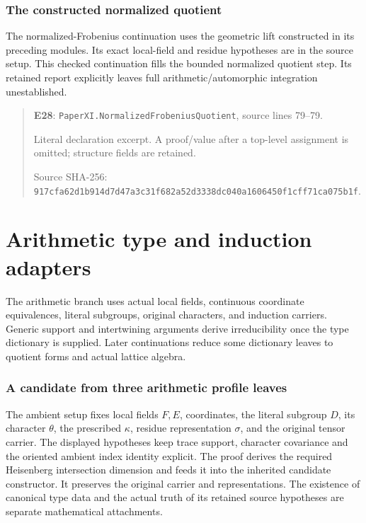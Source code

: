 \documentclass[10pt,oneside]{book}
\begin{document}
\subsection{The constructed normalized quotient}
\label{guide:E28}
The normalized-Frobenius continuation uses the geometric lift constructed in its preceding modules. Its exact local-field and residue hypotheses are in the source setup.
This checked continuation fills the bounded normalized quotient step. Its retained report explicitly leaves full arithmetic/automorphic integration unestablished.

\begin{quote}\footnotesize\textbf{E28}: \nolinkurl{PaperXI.NormalizedFrobeniusQuotient}, source lines 79--79.\par Literal declaration excerpt. A proof/value after a top-level assignment is omitted; structure fields are retained.\par Source SHA-256: {\scriptsize\texttt{917cfa62d1b914d7d47a3c31f682a52d3338dc040a1606450f1cff71ca075b1f}}.\end{quote}


\chapter{Arithmetic type and induction adapters}
The arithmetic branch uses actual local fields, continuous coordinate equivalences, literal subgroups, original characters, and induction carriers. Generic support and intertwining arguments derive irreducibility once the type dictionary is supplied. Later continuations reduce some dictionary leaves to quotient forms and actual lattice algebra.

\subsection{A candidate from three arithmetic profile leaves}
\label{guide:E29}
The ambient setup fixes local fields \(F,E\), coordinates, the literal subgroup \(D\), its character \(\theta\), the prescribed \(\kappa\), residue representation \(\sigma\), and the original tensor carrier. The displayed hypotheses keep trace support, character covariance and the oriented ambient index identity explicit.
The proof derives the required Heisenberg intersection dimension and feeds it into the inherited candidate constructor. It preserves the original carrier and representations. The existence of canonical type data and the actual truth of its retained source hypotheses are separate mathematical attachments.
\end{document}
